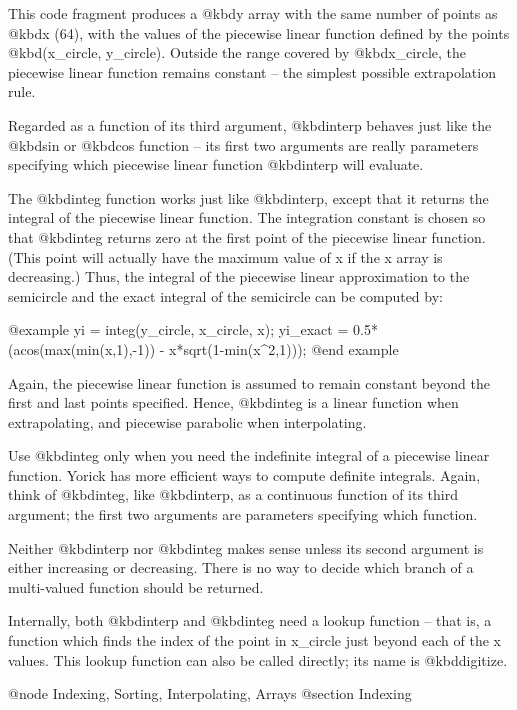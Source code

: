 This code fragment produces a @kbd{y} array with the same number of
points as @kbd{x} (64), with the values of the piecewise linear function
defined by the points @kbd{(x_circle, y_circle)}.  Outside the range
covered by @kbd{x_circle}, the piecewise linear function remains
constant -- the simplest possible extrapolation rule.

Regarded as a function of its third argument, @kbd{interp} behaves just
like the @kbd{sin} or @kbd{cos} function -- its first two arguments are
really parameters specifying which piecewise linear function
@kbd{interp} will evaluate.

The @kbd{integ} function works just like @kbd{interp}, except that it
returns the integral of the piecewise linear function.  The integration
constant is chosen so that @kbd{integ} returns zero at the first point
of the piecewise linear function.  (This point will actually have the
maximum value of x if the x array is decreasing.)  Thus, the integral
of the piecewise linear approximation to the semicircle and the exact
integral of the semicircle can be computed by:

@example
yi = integ(y_circle, x_circle, x);
yi_exact = 0.5*(acos(max(min(x,1),-1)) - x*sqrt(1-min(x^2,1)));
@end example

Again, the piecewise linear function is assumed to remain constant
beyond the first and last points specified.  Hence, @kbd{integ} is a
linear function when extrapolating, and piecewise parabolic when
interpolating.

Use @kbd{integ} only when you need the indefinite integral of a
piecewise linear function.  Yorick has more efficient ways to compute
definite integrals.  Again, think of @kbd{integ}, like @kbd{interp}, as
a continuous function of its third argument; the first two arguments are
parameters specifying which function.

Neither @kbd{interp} nor @kbd{integ} makes sense unless its second
argument is either increasing or decreasing.  There is no way to decide
which branch of a multi-valued function should be returned.

Internally, both @kbd{interp} and @kbd{integ} need a lookup function --
that is, a function which finds the index of the point in x_circle just
beyond each of the x values.  This lookup function can also be called
directly; its name is @kbd{digitize}.



@node    Indexing, Sorting, Interpolating, Arrays
@section Indexing

